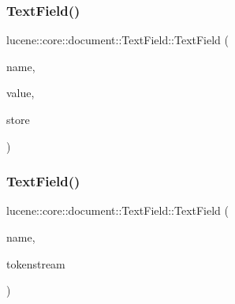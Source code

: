 \mbox{\label{classlucene_1_1core_1_1document_1_1TextField_a7cf6397f05d45eda68c7ff78518e0cac}} 
\subsubsection{\texorpdfstring{Text\+Field()}{TextField()}\hspace{0.1cm}{\footnotesize\ttfamily [3/4]}}
{\footnotesize\ttfamily lucene\+::core\+::document\+::\+Text\+Field\+::\+Text\+Field (\begin{DoxyParamCaption}\item[{const std\+::string \&}]{name,  }\item[{std\+::string \&\&}]{value,  }\item[{const \mbox{\hyperlink{classlucene_1_1core_1_1document_1_1Field_a7d5d79f0c56d3548ab8d46d0e7dae35d}{Field\+::\+Store}}}]{store }\end{DoxyParamCaption})\hspace{0.3cm}{\ttfamily [inline]}}

\mbox{\label{classlucene_1_1core_1_1document_1_1TextField_a326a52b309ab1d5aa778b48f4c63166d}} 
\subsubsection{\texorpdfstring{Text\+Field()}{TextField()}\hspace{0.1cm}{\footnotesize\ttfamily [4/4]}}
{\footnotesize\ttfamily lucene\+::core\+::document\+::\+Text\+Field\+::\+Text\+Field (\begin{DoxyParamCaption}\item[{const std\+::string \&}]{name,  }\item[{\mbox{\hyperlink{classlucene_1_1core_1_1analysis_1_1TokenStream}{lucene\+::core\+::analysis\+::\+Token\+Stream}} $\ast$}]{tokenstream }\end{DoxyParamCaption})\hspace{0.3cm}{\ttfamily [inline]}}

